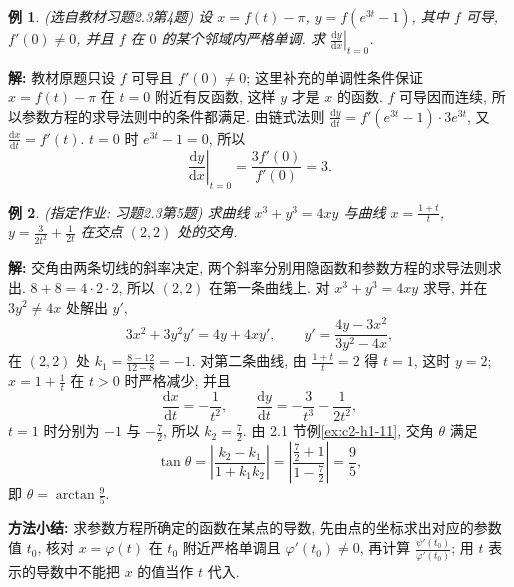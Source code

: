 \documentclass[UTF8,openany]{ctexbook}
\theoremstyle{chinesetextbook}
\newtheorem{example}{例}[section]
\newenvironment{cnsolution}{\par\indent\textbf{解:} \ignorespaces}{\par}
\newcommand{\dd}{\mathrm d}
\begin{document}
\begin{example}\label{ex:c2-h3-4}
\textnormal{(选自教材习题2.3第4题)} 设 $x=f(t)-\pi$, $y=f\left(e^{3t}-1\right)$, 其中 $f$ 可导, $f'(0)\ne0$, 并且 $f$ 在 $0$ 的某个邻域内严格单调. 求 $\displaystyle\left.\frac{\dd y}{\dd x}\right|_{t=0}$.
\end{example}
\begin{cnsolution}
教材原题只设 $f$ 可导且 $f'(0)\ne0$; 这里补充的单调性条件保证 $x=f(t)-\pi$ 在 $t=0$ 附近有反函数, 这样 $y$ 才是 $x$ 的函数. $f$ 可导因而连续, 所以参数方程的求导法则中的条件都满足. 由链式法则 $\displaystyle\frac{\dd y}{\dd t}=f'\left(e^{3t}-1\right)\cdot3e^{3t}$, 又 $\displaystyle\frac{\dd x}{\dd t}=f'(t)$. $t=0$ 时 $e^{3t}-1=0$, 所以
\[
\left.\frac{\dd y}{\dd x}\right|_{t=0}=\frac{3f'(0)}{f'(0)}=3.
\]
\end{cnsolution}
\begin{example}\label{ex:c2-h3-5}
\textnormal{(指定作业: 习题2.3第5题)} 求曲线 $x^3+y^3=4xy$ 与曲线 $\displaystyle x=\frac{1+t}t$, $\displaystyle y=\frac3{2t^2}+\frac1{2t}$ 在交点 $(2,2)$ 处的交角.
\end{example}
\begin{cnsolution}
交角由两条切线的斜率决定, 两个斜率分别用隐函数和参数方程的求导法则求出. $8+8=4\cdot2\cdot2$, 所以 $(2,2)$ 在第一条曲线上. 对 $x^3+y^3=4xy$ 求导, 并在 $3y^2\ne4x$ 处解出 $y'$,
\[
3x^2+3y^2y'=4y+4xy',\qquad y'=\frac{4y-3x^2}{3y^2-4x},
\]
在 $(2,2)$ 处 $\displaystyle k_1=\frac{8-12}{12-8}=-1$. 对第二条曲线, 由 $\displaystyle\frac{1+t}t=2$ 得 $t=1$, 这时 $y=2$; $\displaystyle x=1+\frac1t$ 在 $t>0$ 时严格减少, 并且
\[
\frac{\dd x}{\dd t}=-\frac1{t^2},\qquad\frac{\dd y}{\dd t}=-\frac3{t^3}-\frac1{2t^2},
\]
$t=1$ 时分别为 $-1$ 与 $\displaystyle-\frac72$, 所以 $\displaystyle k_2=\frac72$. 由 2.1 节例\ref{ex:c2-h1-11}, 交角 $\theta$ 满足
\[
\tan\theta=\left|\frac{k_2-k_1}{1+k_1k_2}\right|=\left|\frac{\frac72+1}{1-\frac72}\right|=\frac95,
\]
即 $\displaystyle\theta=\arctan\frac95$.
\end{cnsolution}
\par\indent\textbf{方法小结:} 求参数方程所确定的函数在某点的导数, 先由点的坐标求出对应的参数值 $t_0$, 核对 $x=\varphi(t)$ 在 $t_0$ 附近严格单调且 $\varphi'(t_0)\ne0$, 再计算 $\displaystyle\frac{\psi'(t_0)}{\varphi'(t_0)}$; 用 $t$ 表示的导数中不能把 $x$ 的值当作 $t$ 代入.
\end{document}
